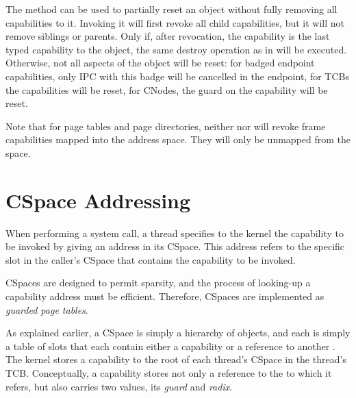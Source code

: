The  method can be used
to partially reset an object without fully removing all capabilities
to it. Invoking it will first revoke all child capabilities, but it
will not remove siblings or parents. Only if, after revocation, the
capability is the last typed capability to the object, the same
destroy operation as in 
will be executed. Otherwise, not all aspects of the object will be
reset: for badged endpoint capabilities, only IPC with this badge will
be cancelled in the endpoint, for TCBs the capabilities will be reset,
for CNodes, the guard on the capability will be reset.

Note that for page tables and page directories, neither
 nor
 will revoke frame
capabilities mapped into the address space.  They will only be
unmapped from the space.


\section{CSpace Addressing}
\label{s:cspace-addressing}

When performing a system call, a thread specifies to the kernel the
capability to be invoked by giving an address in its CSpace. This
address refers to the specific slot in the caller's CSpace that
contains the capability to be invoked.

CSpaces are designed to permit sparsity, and the process of looking-up
a capability address must be efficient. Therefore, CSpaces are
implemented as \emph{guarded page tables}.

As explained earlier, a CSpace is simply a hierarchy of 
objects, and each  is simply a table of slots that each
contain either a capability or a reference to another . The
kernel stores a capability to the root  of each thread's
CSpace in the thread's TCB. Conceptually, a  capability
stores not only a reference to the  to which it refers, but
also carries two values, its \emph{guard} and \emph{radix}.

